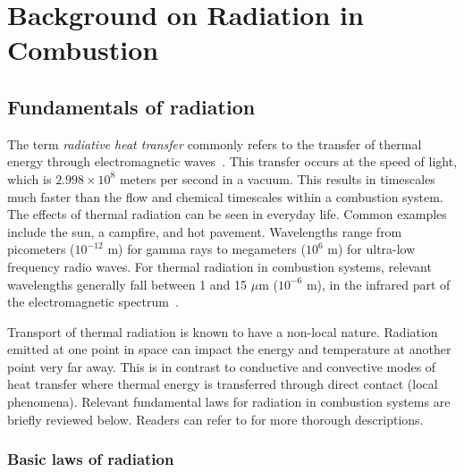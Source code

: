 \addchapheadtotoc
\chapter{Background on Radiation in Combustion}\label{chapter:Importance}

\section{Fundamentals of radiation} \label{Sec:FundOfRad}
The term \textit{radiative heat transfer} commonly refers to the transfer of thermal energy through electromagnetic waves~\cite{Modest2022ChapterRadiation}.
This transfer occurs at the speed of light, which is $2.998 \times 10^8$ meters per second in a vacuum. This results in timescales much faster than the flow and chemical timescales within a combustion system.
The effects of thermal radiation can be seen in everyday life. Common examples include the sun, a campfire, and hot pavement. 
Wavelengths range from picometers ($10^{-12}$ m) for gamma rays to megameters ($10^6$ m) for ultra-low frequency radio waves.
For thermal radiation in combustion systems, relevant wavelengths generally fall between 1 and 15 $\mu{}$m ($10^{-6}$ m), in the infrared part of the electromagnetic spectrum~\cite{Liu2020TheFlames}.

Transport of thermal radiation is known to have a non-local nature. Radiation emitted at one point in space can impact the energy and temperature at another point very far away. 
This is in contrast to conductive and convective modes of heat transfer where thermal energy is transferred through direct contact (local phenomena). 
Relevant fundamental laws for radiation in combustion systems are briefly reviewed below.
Readers can refer to \cite{Howell2010ThermalTransfer,Modest2013RadiativeTransfer} for more thorough descriptions.

\subsection{Basic laws of radiation}\label{section:BasicLaws}

